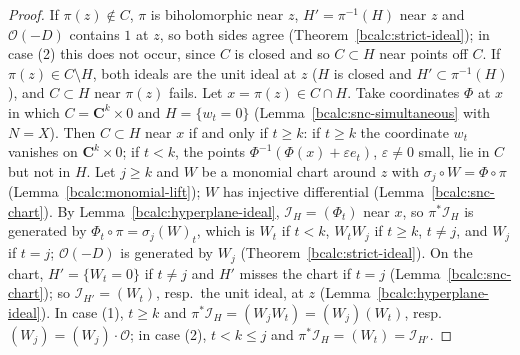 \begin{proof}
\mixedleanok
If \(\pi(z)\notin C\), \(\pi\) is biholomorphic near \(z\), \(H'=\pi^{-1}(H)\) near \(z\) and \(\mathcal O(-D)\) contains \(1\) at \(z\), so both sides agree
(Theorem~\ref{bcalc:strict-ideal}); in case (2) this does not occur, since \(C\) is closed and so \(C\subset H\) near points off \(C\). If \(\pi(z)\in C\setminus H\),
both ideals are the unit ideal at \(z\) (\(H\) is closed and \(H'\subset\pi^{-1}(H)\)), and \(C\subset H\) near \(\pi(z)\) fails. Let \(x=\pi(z)\in C\cap H\).
Take coordinates \(\Phi\) at \(x\) in which \(C=\mathbf C^k\times0\) and \(H=\{w_t=0\}\) (Lemma~\ref{bcalc:snc-simultaneous} with \(N=X\)). Then \(C\subset H\) near \(x\)
if and only if \(t\ge k\): if \(t\ge k\) the coordinate \(w_t\) vanishes on \(\mathbf C^k\times0\); if \(t<k\), the points \(\Phi^{-1}(\Phi(x)+\varepsilon e_t)\),
\(\varepsilon\ne0\) small, lie in \(C\) but not in \(H\). Let \(j\ge k\) and \(W\) be a monomial chart around \(z\) with \(\sigma_j\circ W=\Phi\circ\pi\)
(Lemma~\ref{bcalc:monomial-lift}); \(W\) has injective differential (Lemma~\ref{bcalc:snc-chart}). By Lemma~\ref{bcalc:hyperplane-ideal}, \(\mathcal I_H=(\Phi_t)\)
near \(x\), so \(\pi^*\mathcal I_H\) is generated by \(\Phi_t\circ\pi=\sigma_j(W)_t\), which is \(W_t\) if \(t<k\), \(W_tW_j\) if \(t\ge k\), \(t\ne j\), and \(W_j\)
if \(t=j\); \(\mathcal O(-D)\) is generated by \(W_j\) (Theorem~\ref{bcalc:strict-ideal}). On the chart, \(H'=\{W_t=0\}\) if \(t\ne j\) and \(H'\) misses the chart if
\(t=j\) (Lemma~\ref{bcalc:snc-chart}); so \(\mathcal I_{H'}=(W_t)\), resp.\ the unit ideal, at \(z\) (Lemma~\ref{bcalc:hyperplane-ideal}). In case (1), \(t\ge k\)
and \(\pi^*\mathcal I_H=(W_jW_t)=(W_j)(W_t)\), resp.\ \((W_j)=(W_j)\cdot\mathcal O\); in case (2), \(t<k\le j\) and \(\pi^*\mathcal I_H=(W_t)=\mathcal I_{H'}\).
\end{proof}

